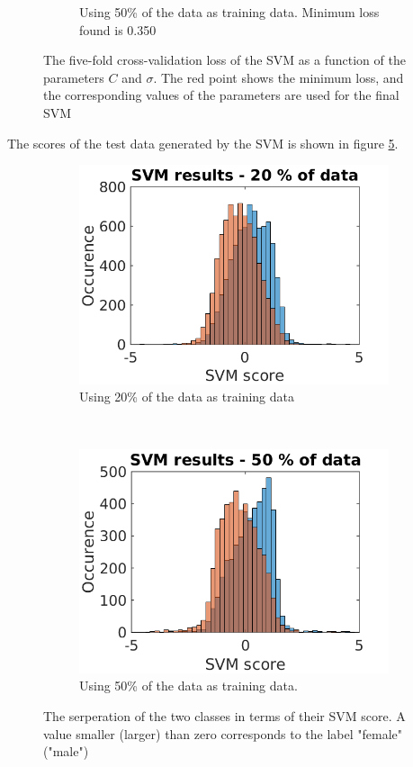 \begin{figure}[h]
\begin{subfigure}[b]{0.45\textwidth}
		\caption{Using 50\% of the data as training data. Minimum loss found is 0.350}
		\label{fig:SVM_05}
    \end{subfigure}
    \caption{The five-fold cross-validation loss of the SVM as a function of the parameters $C$ and $\sigma$. The red point shows the minimum loss, and the corresponding values of the parameters are used for the final SVM}
	\label{fig:SVM_Train}
\end{figure}

\noindent The scores of the test data generated by the SVM is shown in figure \ref{fig:SVM_Result}.

\begin{figure}[h]
    \centering
    \begin{subfigure}[b]{0.45\textwidth}
        \includegraphics[width=\textwidth]{Pix/SVM_02_Score.png}
		\caption{Using 20\% of the data as training data}
		\label{fig:SVM_02_score}
    \end{subfigure}
    ~
    \begin{subfigure}[b]{0.45\textwidth}
        \includegraphics[width=\textwidth]{Pix/SVM_05_Score.png}
		\caption{Using 50\% of the data as training data.}
		\label{fig:SVM_05_score}
    \end{subfigure}
    \caption{The serperation of the two classes in terms of their SVM score. A value smaller (larger) than zero corresponds to the label "female" ("male")}
	\label{fig:SVM_Result}
\end{figure}
\FloatBarrier